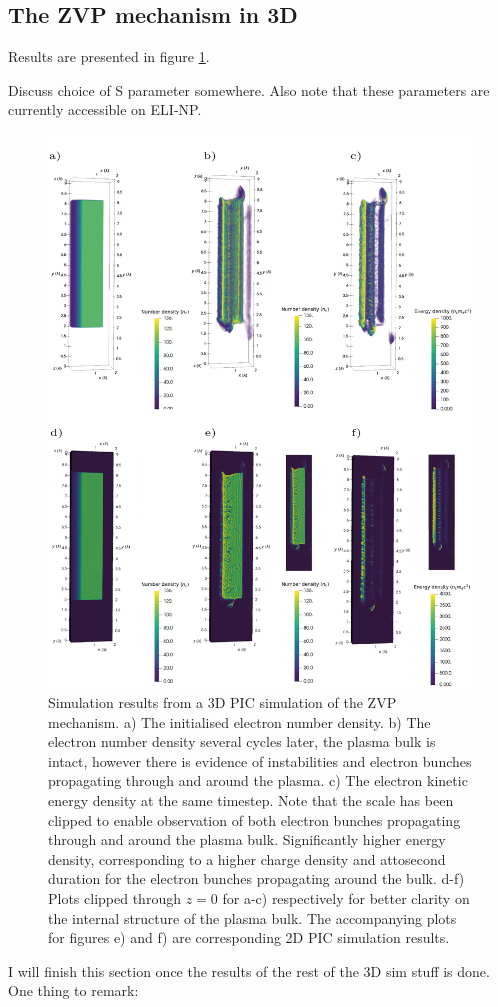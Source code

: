 \subsection{The ZVP mechanism in 3D}
Results are presented in figure \ref{fig:zvp3d}.

Discuss choice of S parameter somewhere. Also note that these parameters are currently accessible on ELI-NP.

\begin{figure}
	\centering
	\includegraphics[width=1\linewidth]{figures/zvp/zvp_3D}
	\caption[Simulation results from a 3D \ac{PIC} simulation of the \ac{ZVP} mechanism. ]{Simulation results from a 3D \ac{PIC} simulation of the \ac{ZVP} mechanism. a) The initialised electron number density. b) The electron number density several cycles later, the plasma bulk is intact, however there is evidence of instabilities and electron bunches propagating through and around the plasma. c) The electron kinetic energy density at the same timestep. Note that the scale has been clipped to enable observation of both electron bunches propagating through and around the plasma bulk. Significantly higher energy density, corresponding to a higher charge density and attosecond duration for the electron bunches propagating around the bulk. d-f) Plots clipped through $z=0$ for a-c) respectively for better clarity on the internal structure of the plasma bulk. The accompanying plots for figures e) and f) are corresponding 2D PIC simulation results.}
	\label{fig:zvp3d}
\end{figure}
I will finish this section once the results of the rest of the 3D sim stuff is done. One thing to remark:

